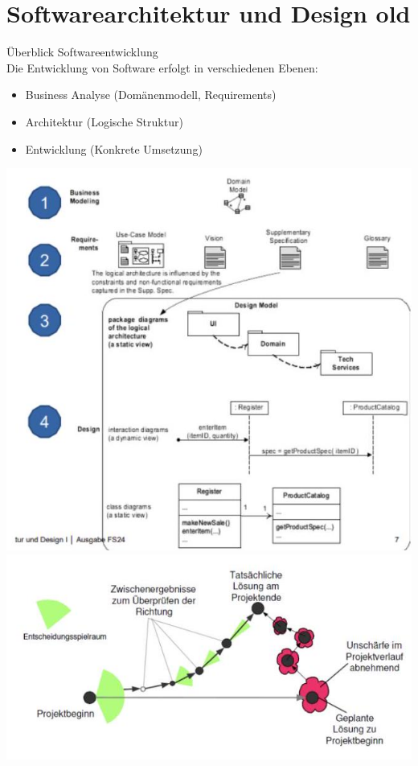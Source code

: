 \section{Softwarearchitektur und Design old}

\begin{concept}{Überblick Softwareentwicklung}\\
Die Entwicklung von Software erfolgt in verschiedenen Ebenen:
\begin{itemize}
    \item Business Analyse (Domänenmodell, Requirements)
    \item Architektur (Logische Struktur)
    \item Entwicklung (Konkrete Umsetzung)
\end{itemize}
\includegraphics[width=\linewidth]{images/2024_12_29_0d1d7b5551ea1b4b41bdg-07(2)}
\includegraphics[width=\linewidth]{images/2024_12_29_0d1d7b5551ea1b4b41bdg-08(1)}
\end{concept}

